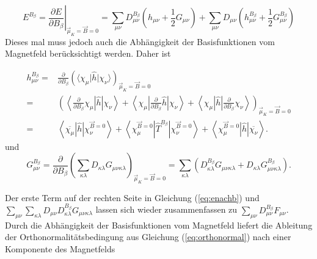	\begin{equation}\label{eq:enachb}
  	  E^{B_\beta}=\left.\frac{\partial E}{\partial B_\beta}\right|_{\vec{\mu}_K=\vec{B}=0}=\sum_{\mu\nu}D_{\mu\nu}^{B_\beta}\left(h_{\mu\nu}+\frac{1}{2}G_{\mu\nu}\right)+\sum_{\mu\nu}D_{\mu\nu}\left(h_{\mu\nu}^{B_\beta}+\frac{1}{2}G_{\mu\nu}^{B_\beta}\right)
  	\end{equation}
  	Dieses mal muss jedoch auch die Abhängigkeit der Basisfunktionen vom Magnetfeld berücksichtigt werden. Daher ist
  	
  	     \begin{equation}
     \begin{aligned}
       h_{\mu\nu}^{B_\beta}=&\frac{\partial}{\partial B_\beta}\left(\langle\chi_\mu\vert\hat{h}\vert\chi_\nu\rangle\right)_{\vec{\mu}_K=\vec{B}=0}\\
       =&\left(\left\langle\frac{\partial}{\partial B_\beta}\chi_\mu\left\vert\hat{h}\right\vert\chi_\nu\right\rangle
        +\left\langle\chi_\mu\left\vert\frac{\partial}{\partial B_\beta}\hat{h}\right\vert\chi_\nu\right\rangle
        +\left\langle\chi_\mu\left\vert\hat{h}\right\vert\frac{\partial}{\partial B_\beta}\chi_\nu\right\rangle\right)_{\vec{\mu}_K=\vec{B}=0}\\
       =&\left\langle\overline{\chi_\mu}\left\vert\hat{h}\right\vert\chi_\nu^{\vec{B}=0}\right\rangle
        +\left\langle\chi_\mu^{\vec{B}=0}\left\vert\hat{T}^{B_\beta}\right\vert\chi_\nu^{\vec{B}=0}\right\rangle
        +\left\langle\chi_\mu^{\vec{B}=0}\left\vert\hat{h}\right\vert\overline{\chi_\nu}\right\rangle.
     \end{aligned}
     \end{equation}
     und 
     \begin{equation}
      G_{\mu\nu}^{B_\beta}= \frac{\partial}{\partial B_\beta} \left(\sum_{\kappa\lambda}D_{\kappa\lambda}G_{\mu\nu\kappa\lambda}\right)_{\vec{\mu}_K=\vec{B}=0}=\sum_{\kappa\lambda}\left(D_{\kappa\lambda}^{B_\beta}G_{\mu\nu\kappa\lambda}+D_{\kappa\lambda}G_{\mu\nu\kappa\lambda}^{B_\beta}\right).
     \end{equation}
     
     Der erste Term auf der rechten Seite in Gleichung (\ref{eq:enachb}) und $\sum_{\mu\nu}\sum_{\kappa\lambda}D_{\mu\nu}D_{\kappa\lambda}^{B_\beta}G_{\mu\nu\kappa\lambda}$      lassen sich wieder zusammenfassen zu $\sum_{\mu\nu}D_{\mu\nu}^{B_\beta}F_{\mu\nu}$. Durch die Abhängigkeit der Basisfunktionen vom Magnetfeld liefert die Ableitung der Orthonormalitätsbedingung aus Gleichung (\ref{eq:orthonormal}) nach einer Komponente des Magnetfelds
     
